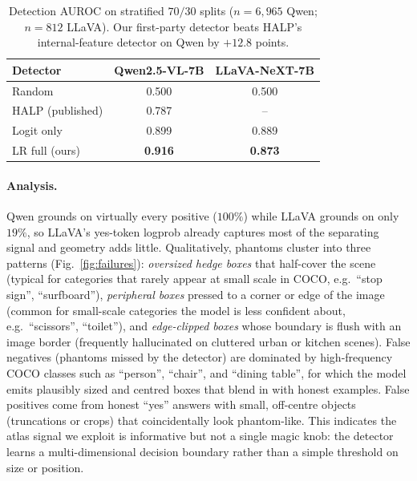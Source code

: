 \documentclass[10pt,twocolumn,letterpaper]{article}
\begin{document}
\begin{table}[!htbp]
\centering\small
\begin{tabular}{lcc}
\toprule
\textbf{Detector} & \textbf{Qwen2.5-VL-7B} & \textbf{LLaVA-NeXT-7B} \\
\midrule
Random                       & 0.500 & 0.500 \\
HALP (published)\cite{halp}  & 0.787 & --    \\
Logit only                   & 0.899 & 0.889 \\
LR full (ours)               & \textbf{0.916} & \textbf{0.873} \\
\bottomrule
\end{tabular}
\caption{Detection AUROC on stratified $70/30$ splits
($n{=}6{,}965$ Qwen; $n{=}812$ LLaVA). Our first-party detector
beats HALP's internal-feature detector on Qwen by $+12.8$ points.}
\label{tab:detector}
\end{table}

\paragraph{Analysis.} Qwen grounds on virtually every positive
($100\%$) while LLaVA grounds on only $19\%$, so LLaVA's yes-token
logprob already captures most of the separating signal and geometry
adds little. Qualitatively, phantoms cluster into three patterns
(Fig.~\ref{fig:failures}): \emph{oversized hedge boxes} that
half-cover the scene (typical for categories that rarely appear at
small scale in COCO, e.g.\ ``stop sign'', ``surfboard''),
\emph{peripheral boxes} pressed to a corner or edge of the image
(common for small-scale categories the model is less confident
about, e.g.\ ``scissors'', ``toilet''), and \emph{edge-clipped
boxes} whose boundary is flush with an image border (frequently
hallucinated on cluttered urban or kitchen scenes).
False negatives (phantoms missed by the detector) are dominated by
high-frequency COCO classes such as ``person'', ``chair'', and
``dining table'', for which the model emits plausibly sized and
centred boxes that blend in with honest examples. False positives
come from honest ``yes'' answers with small, off-centre objects
(truncations or crops) that coincidentally look phantom-like. This
indicates the atlas signal we exploit is informative but not a
single magic knob: the detector learns a multi-dimensional
decision boundary rather than a simple threshold on size or
position.
\end{document}
